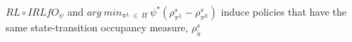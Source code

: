 \begin{prop}
\label{pre:gaifo_preposition}
$RL\circ  IRLfO_{\psi}$ and $ arg \ min_{\pi^{L} \ \in \ \Pi} \ \psi^{*}(\rho^{s}_{\pi^{L}} - \rho^{s}_{\pi^{E}})$ induce policies that have the same state-transition occupancy measure, $\rho^{s}_{\tilde{\pi}}$
\end{prop}